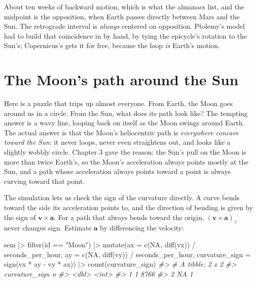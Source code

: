 \documentclass[
  10.5pt,
  letterpaper,
]{scrbook}
\newenvironment{Shaded}{\begin{snugshade}}{\end{snugshade}}
\newcommand{\AttributeTok}[1]{\textcolor[rgb]{0.00,0.00,0.00}{#1}}
\newcommand{\CommentTok}[1]{\textcolor[rgb]{0.00,0.00,0.00}{\textit{#1}}}
\newcommand{\ConstantTok}[1]{\textcolor[rgb]{0.00,0.00,0.00}{#1}}
\newcommand{\FunctionTok}[1]{\textcolor[rgb]{0.00,0.00,0.00}{#1}}
\newcommand{\NormalTok}[1]{\textcolor[rgb]{0.00,0.00,0.00}{#1}}
\newcommand{\SpecialCharTok}[1]{\textcolor[rgb]{0.00,0.00,0.00}{#1}}
\newcommand{\StringTok}[1]{\textcolor[rgb]{0.00,0.00,0.00}{#1}}
\theoremstyle{definition}
\theoremstyle{plain}
\theoremstyle{remark}
\begin{document}
About ten weeks of backward motion, which is what the almanacs list, and
the midpoint is the opposition, when Earth passes directly between Mars
and the Sun. The retrograde interval is \emph{always} centered on
opposition. Ptolemy's model had to build that coincidence in by hand, by
tying the epicycle's rotation to the Sun's; Copernicus's gets it for
free, because the loop \emph{is} Earth's motion.

\section{The Moon's path around the
Sun}\label{the-moons-path-around-the-sun}

Here is a puzzle that trips up almost everyone. From Earth, the Moon
goes around us in a circle. From the Sun, what does its path look like?
The tempting answer is a wavy line, looping back on itself as the Moon
swings around Earth. The actual answer is that the Moon's heliocentric
path is \emph{everywhere concave toward the Sun}: it never loops, never
even straightens out, and looks like a slightly wobbly circle. Chapter 3
gave the reason: the Sun's pull on the Moon is more than twice Earth's,
so the Moon's acceleration always points mostly at the Sun, and a path
whose acceleration always points toward a point is always curving toward
that point.

The simulation lets us check the sign of the curvature directly. A curve
bends toward the side its acceleration points to, and the direction of
bending is given by the sign of \(\mathbf{v}\times\mathbf{a}\). For a
path that always bends toward the origin,
\((\mathbf{v}\times\mathbf{a})_z\) never changes sign. Estimate
\(\mathbf{a}\) by differencing the velocity:

\begin{Shaded}
\begin{Highlighting}[]
\NormalTok{sem }\SpecialCharTok{|\textgreater{}}
  \FunctionTok{filter}\NormalTok{(id }\SpecialCharTok{==} \StringTok{"Moon"}\NormalTok{) }\SpecialCharTok{|\textgreater{}}
  \FunctionTok{mutate}\NormalTok{(}\AttributeTok{ax =} \FunctionTok{c}\NormalTok{(}\ConstantTok{NA}\NormalTok{, }\FunctionTok{diff}\NormalTok{(vx)) }\SpecialCharTok{/}\NormalTok{ seconds\_per\_hour,}
         \AttributeTok{ay =} \FunctionTok{c}\NormalTok{(}\ConstantTok{NA}\NormalTok{, }\FunctionTok{diff}\NormalTok{(vy)) }\SpecialCharTok{/}\NormalTok{ seconds\_per\_hour,}
         \AttributeTok{curvature\_sign =} \FunctionTok{sign}\NormalTok{(vx }\SpecialCharTok{*}\NormalTok{ ay }\SpecialCharTok{{-}}\NormalTok{ vy }\SpecialCharTok{*}\NormalTok{ ax)) }\SpecialCharTok{|\textgreater{}}
  \FunctionTok{count}\NormalTok{(curvature\_sign)}
\CommentTok{\#\textgreater{} \# A tibble: 2 x 2}
\CommentTok{\#\textgreater{}   curvature\_sign     n}
\CommentTok{\#\textgreater{}            \textless{}dbl\textgreater{} \textless{}int\textgreater{}}
\CommentTok{\#\textgreater{} 1              1  8766}
\CommentTok{\#\textgreater{} 2             NA     1}
\end{Highlighting}
\end{Shaded}
\end{document}
